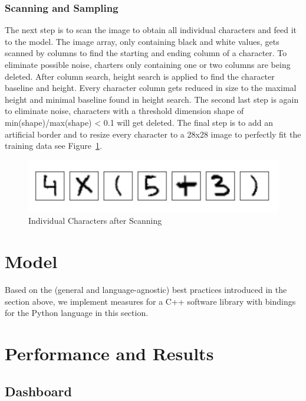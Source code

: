 \documentclass[@CLASSOPTIONS@]{tumarticle}
\begin{document}
\subsubsection{Scanning and Sampling}

The next step is to scan the image to obtain all individual characters and feed it to the model.
The image array, only containing black and white values, gets scanned by columns to find the starting
and ending column of a character.
To eliminate possible noise, charters only containing one or two columns are being deleted.
After column search, height search is applied to find the character baseline and height.
Every character column gets reduced in size to the maximal height and minimal baseline found in height search.
The second last step is again to eliminate noise, characters with a threshold dimension shape of
min(shape)/max(shape) < 0.1 will get deleted.
The final step is to add an artificial border and to resize every character to a 28x28 image to
perfectly fit the training data see Figure~\ref{Fig:Data6}.

\begin{figure}
    \begin{minipage}{0.48\textwidth}
     \centering
     \includegraphics[width=.9\linewidth]{figures/real_data_3}
     \caption{Individual Characters after Scanning}\label{Fig:Data6}
   \end{minipage}
\end{figure}

\section{Model}
\label{sec:implementation}

Based on the (general and language-agnostic) best practices introduced in
the section above, we implement measures for a C++ software library with
bindings for the Python language in this section.

\section{Performance and Results}
\label{sec:customization}

\subsection{Dashboard}
\end{document}
